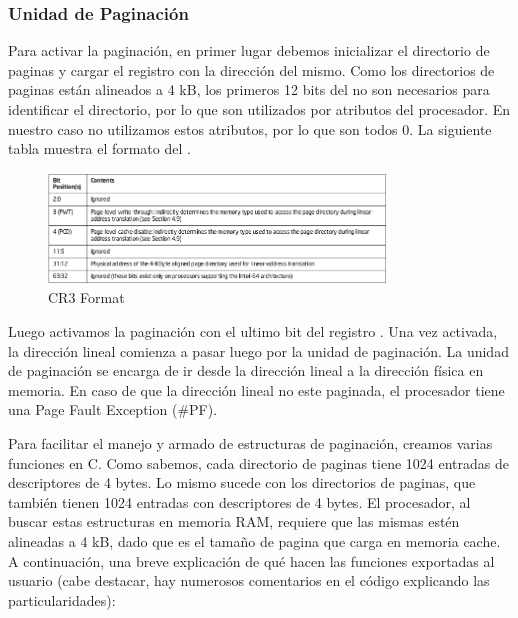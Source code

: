 \subsubsection{Unidad de Paginación}

Para activar la paginación, en primer lugar debemos inicializar el directorio de paginas y cargar el registro  con la dirección del mismo. Como los directorios de paginas están alineados a 4 kB, los primeros 12 bits del  no son necesarios para identificar el directorio, por lo que son utilizados por atributos del procesador. En nuestro caso no utilizamos estos atributos, por lo que son todos 0. La siguiente tabla muestra el formato del .

\begin{figure}[H]
  \centering
    \includegraphics[width=0.8\textwidth]{images/cr3}
  \caption{CR3 Format}
\end{figure}

Luego activamos la paginación con el ultimo bit del registro . Una vez activada, la dirección lineal comienza a pasar luego por la unidad de paginación. La unidad de paginación se encarga de ir desde la dirección lineal a la dirección física en memoria. En caso de que la dirección lineal no este paginada, el procesador tiene una Page Fault Exception (\#PF).

Para facilitar el manejo y armado de estructuras de paginación, creamos varias funciones en C. Como sabemos, cada directorio de paginas tiene 1024 entradas de descriptores de 4 bytes. Lo mismo sucede con los directorios de paginas, que también tienen 1024 entradas con descriptores de 4 bytes. El procesador, al buscar estas estructuras en memoria RAM, requiere que las mismas estén alineadas a 4 kB, dado que es el tamaño de pagina que carga en memoria cache. A continuación, una breve explicación de qué hacen las funciones exportadas al usuario (cabe destacar, hay numerosos comentarios en el código explicando las particularidades):

